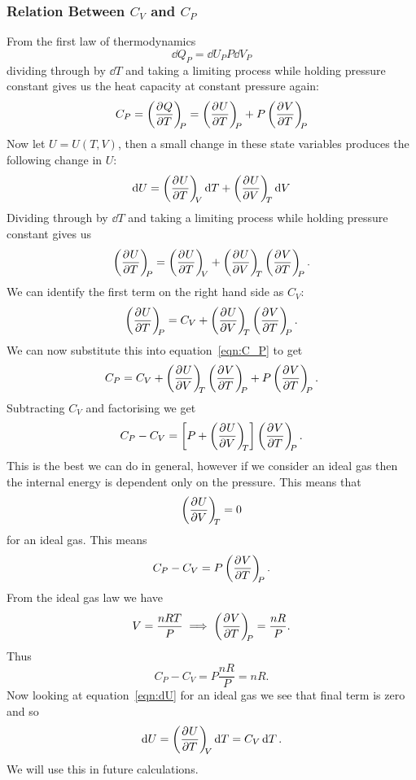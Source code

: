     \subsubsection{Relation Between \texorpdfstring{\(C_V\)}{CV} and \texorpdfstring{\(C_P\)}{CP}}
    From the first law of thermodynamics
    \[\dd{Q_P} = \dd{U_P} P\dd{V_P}\]
    dividing through by \(\dd{T}\) and taking a limiting process while holding pressure constant gives us the heat capacity at constant pressure again:
    \begin{equation}\label{eqn:C_P}
        C_P = \left(\pdv[]{Q}{T}\right)_{\!\!{P}} = \left(\pdv[]{U}{T}\right)_{\!\!{P}} + P\left(\pdv[]{V}{T}\right)_{\!\!{P}}
    \end{equation}
    Now let \(U = U(T, V)\), then a small change in these state variables produces the following change in \(U\):
    \begin{equation}\label{eqn:dU}
        \dd{U} = \left(\pdv[]{U}{T}\right)_{\!\!{V}}\dd{T} + \left(\pdv[]{U}{V}\right)_{\!\!{T}}\dd{V}
    \end{equation}
    Dividing through by \(\dd{T}\) and taking a limiting process while holding pressure constant gives us
    \[\pdvconst{U}{T}{P} = \pdvconst{U}{T}{V} + \pdvconst{U}{V}{T}\pdvconst{V}{T}{P}.\]
    We can identify the first term on the right hand side as \(C_V\):
    \[\left(\pdv[]{U}{T}\right)_{\!\!{P}} = C_V + \left(\pdv[]{U}{V}\right)_{\!\!{T}}\left(\pdv[]{V}{T}\right)_{\!\!{P}}.\]
    We can now substitute this into equation~\ref{eqn:C_P} to get
    \[C_P = C_V + \left(\pdv[]{U}{V}\right)_{\!\!{T}}\left(\pdv[]{V}{T}\right)_{\!\!{P}} + P\left(\pdv[]{V}{T}\right)_{\!\!{P}}.\]
    Subtracting \(C_V\) and factorising we get
    \[C_P - C_V = \left[P + \left(\pdv[]{U}{V}\right)_{\!\!{T}}\right]\left(\pdv[]{V}{T}\right)_{\!\!{P}}.\]
    This is the best we can do in general, however if we consider an ideal gas then the internal energy is dependent only on the pressure.
    This means that
    \[\left(\pdv[]{U}{V}\right)_{\!\!{T}} = 0\]
    for an ideal gas.
    This means
    \[C_P - C_V = P\left(\pdv[]{V}{T}\right)_{\!\!{P}}.\]
    From the ideal gas law we have
    \[V = \frac{nRT}{P} \implies \left(\pdv[]{V}{T}\right)_{\!\!{P}} = \frac{nR}{P}.\]
    Thus
    \begin{equation}\label{eqn:C_P - C_V = nR ideal gas}
        C_P - C_V = P\frac{nR}{P} = nR.
    \end{equation}
    Now looking at equation~\ref{eqn:dU} for an ideal gas we see that final term is zero and so
    \begin{equation}\label{eqn:dU = C_VdT ideal gas}
        \dd{U} = \left(\pdv[]{U}{T}\right)_{\!\!{V}}\dd{T} = C_V\dd{T}.
   \end{equation} 
    We will use this in future calculations.
    
